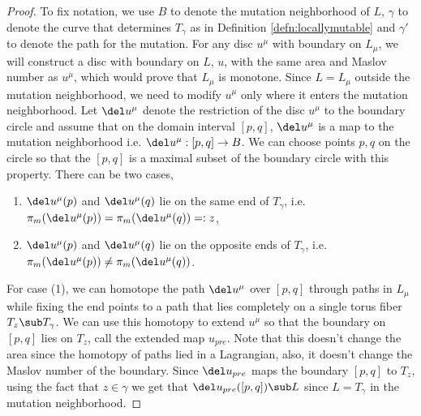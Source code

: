 \begin{proof}
To fix notation, we use $B$ to denote the mutation neighborhood of $L$, $\gamma$ to denote the curve that determines $T_\gamma$ as in  Definition \ref{defn:locallymutable} and $\gamma'$ to denote the path for the mutation. For any disc $u^\mu $ with boundary on $L_\mu$, we will construct a disc with boundary on $L$, $u$, with the same area and Maslov number as $u^\mu$, which would prove that $L_\mu$ is monotone. Since $L=L_\mu$ outside the mutation neighborhood, we need to modify $u^\mu$ only where it enters the mutation neighborhood. Let $\del u^\mu$ denote the restriction of the disc $u^\mu$ to the boundary circle  and assume that on the domain interval $[p,q]$, $\del u^\mu$ is a map to the mutation neighborhood i.e. $\del u^\mu : [p,q] \to B$. We can choose points $p,q$ on the circle so that the $[p,q]$ is a maximal subset of the boundary circle with this property. There can be two cases,
\begin{enumerate}


    \item $\del u^\mu (p)$ and $\del u^\mu(q)$ lie on the same end of $T_\gamma$, i.e.\ $\pi_m(\del u^\mu(p)) = \pi_m(\del u^\mu(q))=:z$,
    \item $\del u^\mu (p)$ and $\del u^\mu(q)$ lie on the opposite ends of $T_\gamma$, i.e.\ $\pi_m(\del u^\mu(p)) \neq \pi_m(\del u^\mu(q))$.
\end{enumerate}
 
 For case (1), we can homotope the path $\del u^\mu$ over $[p,q]$ through paths in $L_\mu$  while fixing the end points to a path that lies completely on a single torus fiber $T_z \sub T_\gamma$. We can use this homotopy to extend $u^\mu$ so that the boundary on $[p,q]$ lies on $T_z$, call the extended map $u_{pre}$. Note that this doesn't change the area since the homotopy of paths lied in a Lagrangian, also, it doesn't change the Maslov number of the boundary. Since $\del u_{pre}$ maps the boundary $[p,q]$ to $T_z$, using the fact that $z\in \gamma$ we get that $\del u_{pre} ([p,q]) \sub L$ since $L = T_\gamma$ in the mutation neighborhood.




\end{proof}
